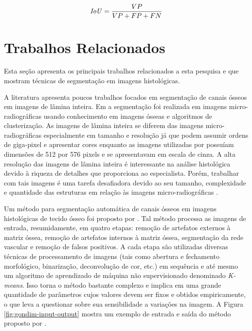 \begin{equation}
\mbox{\textit{IoU}} = \frac{VP}{VP + FP + FN}
\label{eq-iou}
\end{equation}

\section{Trabalhos Relacionados}
Esta seção apresenta os principais trabalhos relacionados a esta pesquisa e que mostram técnicas de segmentação em imagens histológicas.

A literatura apresenta poucos trabalhos focados em segmentação de canais ósseos em imagens de lâmina inteira. Em \cite{liu1999bone} a segmentação foi realizada em imagens micro-radiográficas usando conhecimento em imagens ósseas e algoritmos de clusterização. As imagens de lâmina inteira se diferem das imagens micro-radiográficas especialmente em tamanho e resolução já que podem assumir ordens de giga-pixel e apresentar cores enquanto as imagens utilizadas por \cite{liu1999bone} possuíam dimensões de 512 por 576 pixels e se apresentavam em escala de cinza. A alta resolução das imagens de lâmina inteira é interessante na análise histológica devido à riqueza de detalhes que proporciona ao especialista. Porém, trabalhar com tais imagens é uma tarefa desafiadora devido ao seu tamanho, complexidade e quantidade das estruturas em relação às imagens micro-radiográficas \cite{gondim2021automatic}. 


Um método para segmentação automática de canais ósseos em imagens histológicas de tecido ósseo foi proposto por \cite{gondim2021automatic}. 
Tal método processa as imagens de entrada, resumidamente, em quatro etapas: remoção de artefatos externos à matriz óssea, remoção de artefatos internos à matriz óssea, segmentação da rede vascular e remoção de falsos positivos. A cada etapa são utilizadas diversas técnicas de processamento de imagens (tais como abertura e fechamento morfológico, binarização, deconvolução de cor, etc.) em sequência e até mesmo um algoritmo de aprendizado de máquina não supervisionado denominado \textit{K-means}. Isso torna o método bastante complexo e implica em uma grande quantidade de parâmetros cujos valores devem ser fixos e obtidos empiricamente, o que leva a questionar sobre sua sensibilidade a variações na imagem. A Figura \ref{fig:gondim-input-output} mostra um exemplo de entrada e saída do método proposto por \cite{gondim2021automatic}.

